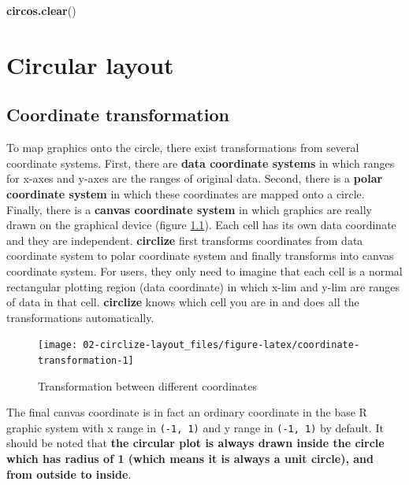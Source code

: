 \documentclass[]{book}
\newenvironment{Shaded}{\begin{snugshade}}{\end{snugshade}}
\newcommand{\KeywordTok}[1]{\textcolor[rgb]{0.13,0.29,0.53}{\textbf{#1}}}
\newcommand{\NormalTok}[1]{#1}
\begin{document}
\begin{Shaded}
\begin{Highlighting}[]
\KeywordTok{circos.clear}\NormalTok{()}
\end{Highlighting}
\end{Shaded}

\chapter{Circular layout}\label{circular-layout}

\section{Coordinate transformation}\label{coordinate-transformation}

To map graphics onto the circle, there exist transformations from
several coordinate systems. First, there are \textbf{data coordinate
systems} in which ranges for x-axes and y-axes are the ranges of
original data. Second, there is a \textbf{polar coordinate system} in
which these coordinates are mapped onto a circle. Finally, there is a
\textbf{canvas coordinate system} in which graphics are really drawn on
the graphical device (figure \ref{fig:coordinate-transformation}). Each
cell has its own data coordinate and they are independent.
\textbf{circlize} first transforms coordinates from data coordinate
system to polar coordinate system and finally transforms into canvas
coordinate system. For users, they only need to imagine that each cell
is a normal rectangular plotting region (data coordinate) in which x-lim
and y-lim are ranges of data in that cell. \textbf{circlize} knows which
cell you are in and does all the transformations automatically.

\begin{figure}

{\centering \texttt{[image: 02-circlize-layout\_files/figure-latex/coordinate-transformation-1]} 

}

\caption{Transformation between different coordinates}\label{fig:coordinate-transformation}
\end{figure}

The final canvas coordinate is in fact an ordinary coordinate in the
base R graphic system with x range in \texttt{(-1,\ 1)} and y range in
\texttt{(-1,\ 1)} by default. It should be noted that \textbf{the
circular plot is always drawn inside the circle which has radius of 1
(which means it is always a unit circle), and from outside to inside}.
\end{document}
